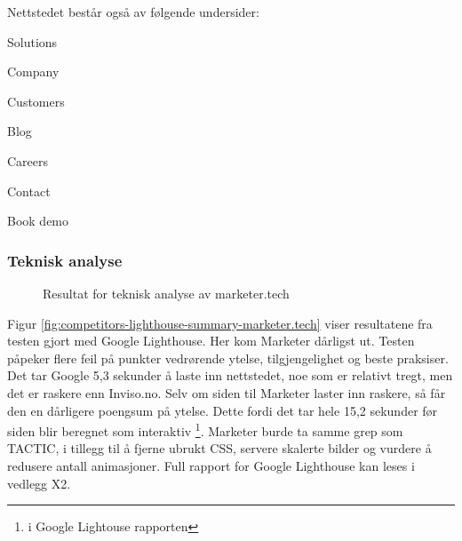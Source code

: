 Nettstedet består også av følgende undersider:
\begin{compactitem}
\item Solutions
\item Company
\item Customers
\item Blog
\item Careers 
\item Contact
\item Book demo
\end{compactitem}

\subsubsection{Teknisk analyse}
\begin{figure}[H]
    \begin{center}
        
        \label{fig:competitors-tech_analysis-marketer.tech}
        \caption{Resultat for teknisk analyse av marketer.tech}
    \end{center}
\end{figure}

Figur \ref{fig:competitors-lighthouse-summary-marketer.tech} viser resultatene fra testen gjort med Google Lighthouse. Her kom Marketer dårligst ut. Testen påpeker flere feil på punkter vedrørende ytelse, tilgjengelighet og beste praksiser. Det tar Google 5,3 sekunder å laste inn nettstedet, noe som er relativt tregt, men det er raskere enn Inviso.no. Selv om siden til Marketer  laster inn raskere, så får den en dårligere poengsum på ytelse. Dette fordi det tar hele 15,2 sekunder før siden blir beregnet som interaktiv \footnote{ i Google Lightouse rapporten}. Marketer burde ta samme grep som TACTIC, i tillegg til å fjerne ubrukt CSS, servere skalerte bilder og vurdere å redusere antall animasjoner.
Full rapport for Google Lighthouse kan leses i vedlegg X2.

